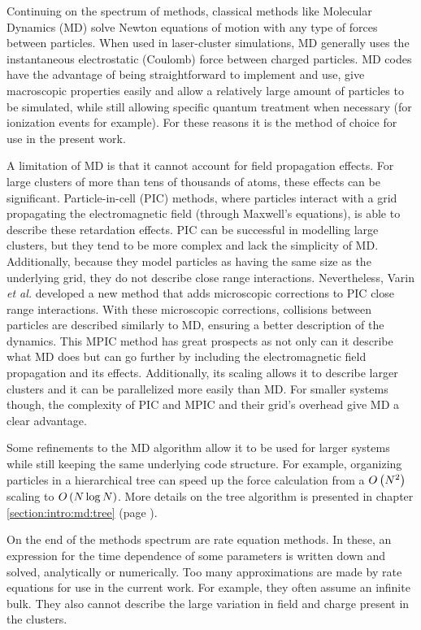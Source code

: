 Continuing on the spectrum of methods, classical methods like Molecular
Dynamics (MD) solve Newton
equations of motion with any type of forces between particles\cite{Skeel1998}.
When used in
laser-cluster simulations, MD generally uses the instantaneous electrostatic
(Coulomb) force between charged particles. MD codes have the advantage of being
straightforward to implement and use, give macroscopic properties easily and allow a
relatively large amount of particles to be simulated, while still allowing
specific quantum treatment when necessary (for ionization events for example). For
these reasons it is the method of choice for use in the present work.

A limitation of MD is that it cannot account for field propagation effects. For
large clusters of more than tens of thousands of atoms, these effects can be
significant. Particle-in-cell (PIC) methods, where particles interact with a grid propagating the
electromagnetic field (through Maxwell's equations),
is able to describe these retardation effects. PIC can be successful in
modelling large clusters, but they tend to be more complex and lack the
simplicity of MD. Additionally, because they model particles as having the same
size as the underlying grid, they do not describe close range interactions.
Nevertheless, Varin \textit{et al.} developed a new method that adds microscopic
corrections to PIC close range interactions\cite{Varin2012}. With these microscopic
corrections, collisions between particles are described similarly to MD, ensuring
a better description of the dynamics. This MPIC method has great prospects
as not only can it describe what MD does but can go further by including the
electromagnetic field propagation and its effects. Additionally, its scaling
allows it to describe larger clusters and it can be parallelized more easily
than MD. For smaller systems though, the complexity of PIC and MPIC and their
grid's overhead give MD a clear advantage.

Some refinements to the MD algorithm allow it to be used for larger systems
while still keeping the same underlying code structure. For example, organizing
particles in a hierarchical tree\cite{Barnes1986,Gibbon2002} can speed up the force
calculation from a $O\left( N^2 \right)$ scaling to $O\left( N \log{N} \right)$. More details on the
tree algorithm is presented in chapter \ref{section:intro:md:tree} (page
\pageref{section:intro:md:tree}).

On the end of the methods spectrum are rate equation methods. In these, an
expression for the time dependence of some parameters is written down and solved,
analytically or numerically. Too many approximations
are made by rate equations for use in the current work. For example, they often
assume an infinite bulk. They also cannot describe the large variation in field
and charge present in the clusters.

